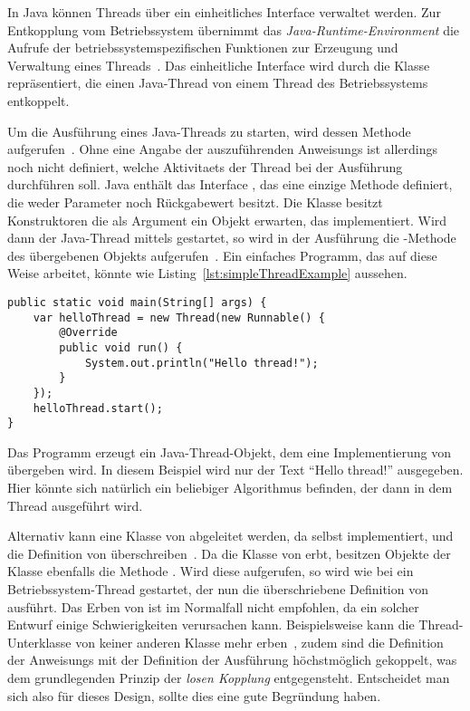 In Java können Threads über ein einheitliches Interface verwaltet werden. Zur Entkopplung vom Betriebssystem übernimmt das \emph{Java-Runtime-Environment} die Aufrufe der betriebssystemspezifischen Funktionen zur Erzeugung und Verwaltung eines Threads~\cite[S.~3]{Friesen2015}. Das einheitliche Interface wird durch die Klasse  repräsentiert, die einen Java-Thread von einem Thread des  Betriebssystems entkoppelt. 

Um die Ausführung eines Java-Threads zu starten, wird dessen Methode  aufgerufen~\cite[S.~8]{Friesen2015}. Ohne eine Angabe der auszuführenden \glspl{Anweisung} ist allerdings noch nicht definiert, welche \glspl{Aktivitaet} der Thread bei der Ausführung durchführen soll. Java enthält das Interface , das eine einzige Methode  definiert, die weder Parameter noch Rückgabewert besitzt. Die Klasse  besitzt Konstruktoren die als Argument ein Objekt erwarten, das  implementiert. Wird dann der Java-Thread mittels  gestartet, so wird in der Ausführung die -Methode des übergebenen Objekts aufgerufen~\cite[S.~3]{Friesen2015}. Ein einfaches \gls{Programm}, das auf diese Weise arbeitet, könnte wie Listing~\ref{lst:simpleThreadExample} aussehen.
\begin{lstlisting}[caption={[Beispiel für ein Java-\glsentrylong{Programm} das einen mit einem \class{Runnable}-Objekt einen Thread erzeugt und dann startet.]Beispiel für ein Java-\gls{Programm} das einen mit einem \class{Runnable}-Objekt einen Thread erzeugt und dann startet.},label={lst:simpleThreadExample}]
public static void main(String[] args) {
	var helloThread = new Thread(new Runnable() {
		@Override
		public void run() {
			System.out.println("Hello thread!");
		}
	});
	helloThread.start();
}
\end{lstlisting}
Das \gls{Programm} erzeugt ein Java-Thread-Objekt, dem eine Implementierung von  übergeben wird. In diesem Beispiel wird nur der Text \enquote{Hello thread!} ausgegeben. Hier könnte sich natürlich ein beliebiger Algorithmus befinden, der dann in dem Thread ausgeführt wird.

Alternativ kann eine Klasse von  abgeleitet werden, da  selbst  implementiert, und die Definition von  überschreiben~\cite[S.~335]{Rauber2006}. Da die Klasse von  erbt, besitzen Objekte der Klasse ebenfalls die Methode . Wird diese aufgerufen, so wird wie bei  ein Betriebssystem-Thread gestartet, der nun die überschriebene Definition von  ausführt. Das Erben von  ist im Normalfall nicht empfohlen, da ein solcher Entwurf einige Schwierigkeiten verursachen kann. Beispielsweise kann die Thread-Unterklasse von keiner anderen Klasse mehr erben~\cite[S.~335]{Rauber2006}, zudem sind die Definition der \glspl{Anweisung} mit der Definition der Ausführung höchstmöglich gekoppelt, was dem grundlegenden Prinzip der \emph{losen Kopplung} entgegensteht. Entscheidet man sich also für dieses Design, sollte dies eine gute Begründung haben.


